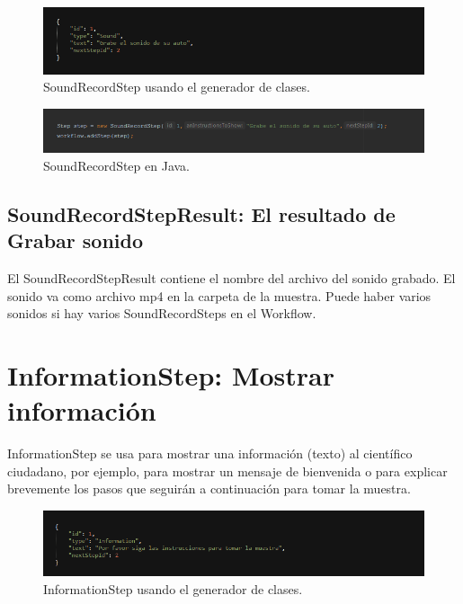 \begin{figure}[H]
  \centering
    \includegraphics[scale=0.6]{50-anexos/C-steps/sound_json.png} 
    \caption{SoundRecordStep usando el generador de clases.}
\end{figure}	

\begin{figure}[H]
  \centering
    \includegraphics[scale=0.6]{50-anexos/C-steps/sound_java.png} 
    \caption{SoundRecordStep en Java.}
\end{figure}


\subsection{SoundRecordStepResult: El resultado de Grabar sonido}
El SoundRecordStepResult contiene el nombre del archivo del sonido grabado. El sonido va como archivo mp4 en la carpeta de la muestra.
Puede haber varios sonidos si hay varios SoundRecordSteps en el Workflow.



\section{InformationStep: Mostrar información}
InformationStep se usa para mostrar una información (texto) al científico ciudadano, por ejemplo, para mostrar un mensaje de bienvenida o para explicar brevemente los pasos que seguirán a continuación para tomar la muestra.


\begin{figure}[H]
  \centering
    \includegraphics[scale=0.6]{50-anexos/C-steps/information_json.png} 
    \caption{InformationStep usando el generador de clases.}
\end{figure}	

